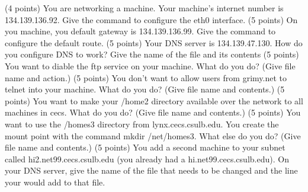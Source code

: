 \ques
(4 points)
You are networking a machine. 
Your machine's internet number is {\ltt{}134.139.136.92}.
Give the command to configure the {\ltt{}eth0} interface.
\vskip 0.5in
\ques
(5 points)
On you machine, you default gateway is {\ltt{}134.139.136.99}.
Give the command to configure the default route.
\vfill\eject
\ques
(5 points)
Your DNS server is {\ltt{}134.139.47.130}.
How do you configure DNS to work? Give the name of the file and its contents
\vskip 1.5in
\ques
(5 points)
You want to diable the {\ltt{}ftp} service on your machine.
What do you do? (Give file name and action.)
\vskip 0.8in
\ques
(5 points)
You don't want to allow users from {\ltt{}grimy.net} to telnet into your
machine.
What do you do? (Give file name and contents.)
\vskip 0.9in
\ques
(5 points)
You want to make your {\ltt{}/home2} directory available over the network
to all machines in {\ltt{}cecs}.
What do you do? (Give file name and contents.)
\vskip 0.9in
\ques
(5 points)
You want to use the {\ltt{}/homes3} directory from {\ltt{}lynx.cecs.csulb.edu}.
You create the mount point with the command {\ltt{}mkdir /net/homes3}.
What else do you do? (Give file name and contents.)
\vskip 0.9in
\ques
(5 points)
You add a second machine to your subnet called
{\ltt{}hi2.net99.cecs.csulb.edu} (you already had a 
{\ltt{}hi.net99.cecs.csulb.edu}).
On your DNS server, give the name of the file that needs to be changed 
and the line your would add to that file.
\vfill\eject
\bye
